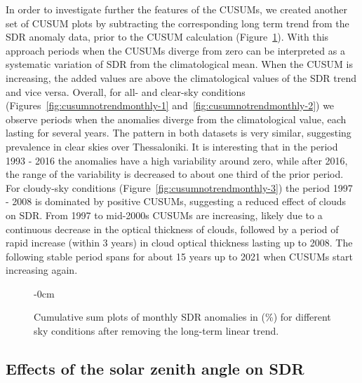 \documentclass[applsci,article,submit,moreauthors,pdftex]{Definitions/mdpi}
\providecommand{\DIFaddbegin}{} %
\providecommand{\DIFaddend}{} %
\providecommand{\DIFdelbegin}{} %
\providecommand{\DIFdelend}{} %
\begin{document}
In order to investigate further the features of the CUSUMs, we created
another set of CUSUM plots by subtracting the corresponding long term
trend from the SDR anomaly data, prior to the CUSUM calculation
(Figure~\ref{fig:cusumnotrendmonthly}). With this approach periods when
the CUSUMs diverge from zero can be interpreted as a systematic
variation of SDR from the climatological mean. When the CUSUM is
increasing, the added values are above the climatological values of the
SDR trend and vice versa. Overall, for all- and clear-sky conditions
(Figures~\ref{fig:cusumnotrendmonthly-1}
and~\ref{fig:cusumnotrendmonthly-2}) we observe periods when the
anomalies diverge from the climatological value, each lasting for
several years. The pattern in both datasets is very similar, suggesting
prevalence in clear skies over Thessaloniki. It is interesting that in
the period 1993 - 2016 the anomalies have a high variability around
zero, while after 2016, the range of the variability is decreased to
about one third of the prior period. For cloudy-sky conditions
(Figure~\ref{fig:cusumnotrendmonthly-3}) the period 1997 - 2008 is
dominated by positive CUSUMs, suggesting a reduced effect of clouds on
SDR. From 1997 to mid-2000s CUSUMs are increasing, likely due to a
continuous decrease in the optical thickness of clouds, followed by a
period of rapid increase (within 3 years) in cloud optical thickness
lasting up to 2008. The following stable period spans for about 15 years
up to 2021 when CUSUMs start increasing again.

\begin{figure}[h!]
    \begin{adjustwidth}{-\extralength}{0cm}
        {\centering 
            \hfill
            \hfill
        }
        \caption{Cumulative sum plots of monthly SDR anomalies in (\%) for different sky conditions after removing the long-term linear trend.}\label{fig:cusumnotrendmonthly}
\end{adjustwidth}
\end{figure}

\DIFdelbegin %
\DIFdelend \DIFaddbegin \hypertarget{effects-of-the-solar-zenith-angle-on-sdr}{%
\subsection{Effects of the solar zenith angle on
SDR}\label{effects-of-the-solar-zenith-angle-on-sdr}}
\DIFaddend 
\end{document}
